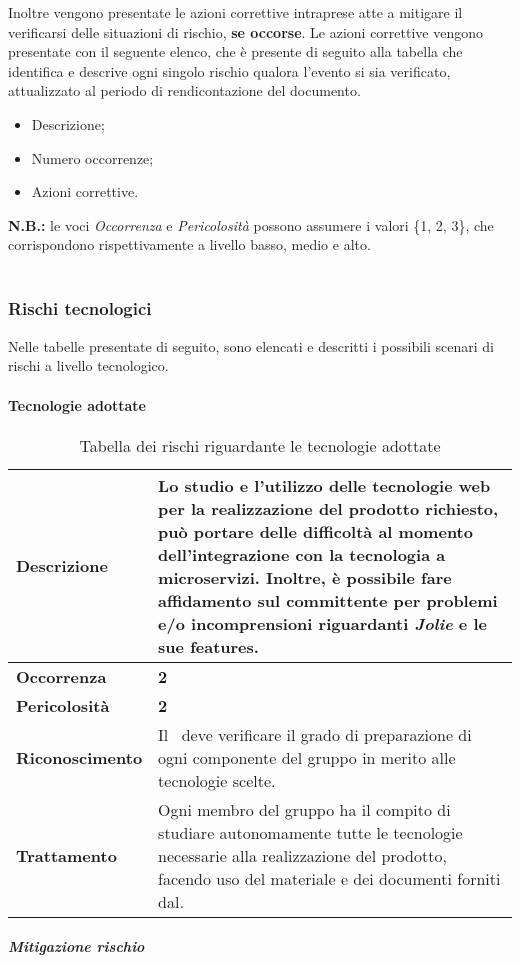 Inoltre vengono presentate le azioni correttive intraprese atte a mitigare il verificarsi delle situazioni di rischio, \textbf{se occorse}. Le azioni correttive vengono presentate con il seguente elenco, che è presente di seguito alla tabella che identifica e descrive ogni singolo rischio qualora l'evento si sia verificato, attualizzato al periodo di rendicontazione del documento.

\begin{itemize}
	\item Descrizione;
	\item Numero occorrenze;
	\item Azioni correttive.
\end{itemize}

\textbf{N.B.:} le voci \textit{Occorrenza} e \textit{Pericolosità} possono assumere i valori \{1, 2, 3\}, che corrispondono rispettivamente a livello basso, medio e alto.\\\\


\subsubsection{Rischi tecnologici}

Nelle tabelle presentate di seguito, sono elencati e descritti i possibili scenari di rischi a livello tecnologico.

\paragraph{Tecnologie adottate}

\begin{table}[H]
	\begin{center}
		\begin{tabular}{|l | p{11cm}|}
			\hline
			\textbf{Descrizione}	& Lo studio e l'utilizzo delle tecnologie web per la realizzazione del prodotto richiesto, può portare delle difficoltà al momento dell'integrazione con la tecnologia a microservizi. Inoltre, è possibile fare affidamento sul committente per problemi e/o incomprensioni riguardanti \textit{Jolie\ped{G}} e le sue features. \\
			\hline
			\textbf{Occorrenza}	&	\textbf{2}	\\
			\hline
			\textbf{Pericolosità}	&	\textbf{2}	\\
			\hline
			\textbf{Riconoscimento}	&	Il \textit{\RdP}\ deve verificare il grado di preparazione di ogni componente del gruppo in merito alle tecnologie scelte.	\\
			\hline
			\textbf{Trattamento}	&	Ogni membro del gruppo ha il compito di studiare autonomamente tutte le tecnologie necessarie alla realizzazione del prodotto, facendo uso del materiale e dei documenti forniti dal\textit{\RdP}.	\\
			\hline
		\end{tabular}
	\caption{Tabella dei rischi riguardante le tecnologie adottate}
	\end{center}
\end{table}
\subparagraph{Mitigazione rischio}

